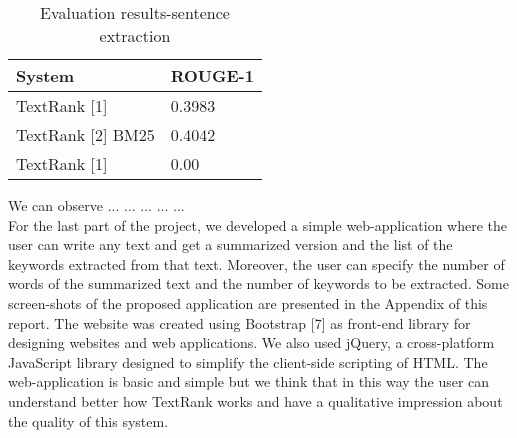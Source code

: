 \documentclass[twoside,twocolumn]{article}
\begin{document}
\begin{table}[t]
  \centering
  \begin{tabular}{| l  l |}
  \hline
    \textbf{System} & \textbf{ROUGE-1} \\ \hline
    TextRank [1] & 0.3983 \\ \hline
    TextRank [2] BM25 & 0.4042 \\ \hline
    TextRank [1] & 0.00 \\ \hline
  \end{tabular}
  \caption{Evaluation results-sentence extraction}
  \label{tab:2}
\end{table}

We can observe ... ... ... ... ...  \\
For the last part of the project, we developed a simple web-application where the user can write any text and get a summarized version and the list of the keywords extracted from that text. Moreover, the user can specify the number of words of the summarized text and the number of keywords to be extracted. Some screen-shots of the proposed application are presented in the Appendix of this report. The website was created using Bootstrap [7] as front-end library for designing websites and web applications. We also used jQuery, a cross-platform JavaScript library designed to simplify the client-side scripting of HTML. The web-application is basic and simple but we think that in this way the user can understand better how TextRank works and have a qualitative impression about the quality of this system.
\end{document}

